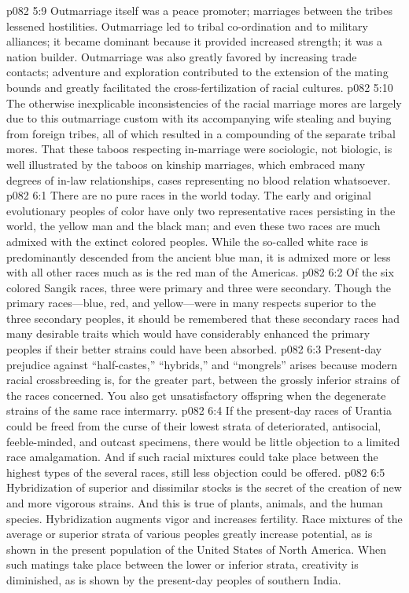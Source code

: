 \vs p082 5:9 Outmarriage itself was a peace promoter; marriages between the tribes lessened hostilities. Outmarriage led to tribal co\hyp{}ordination and to military alliances; it became dominant because it provided increased strength; it was a nation builder. Outmarriage was also greatly favored by increasing trade contacts; adventure and exploration contributed to the extension of the mating bounds and greatly facilitated the cross\hyp{}fertilization of racial cultures.
\vs p082 5:10 The otherwise inexplicable inconsistencies of the racial marriage mores are largely due to this outmarriage custom with its accompanying wife stealing and buying from foreign tribes, all of which resulted in a compounding of the separate tribal mores. That these taboos respecting in\hyp{}marriage were sociologic, not biologic, is well illustrated by the taboos on kinship marriages, which embraced many degrees of in\hyp{}law relationships, cases representing no blood relation whatsoever.
\vs p082 6:1 There are no pure races in the world today. The early and original evolutionary peoples of color have only two representative races persisting in the world, the yellow man and the black man; and even these two races are much admixed with the extinct colored peoples. While the so\hyp{}called white race is predominantly descended from the ancient blue man, it is admixed more or less with all other races much as is the red man of the Americas.
\vs p082 6:2 Of the six colored Sangik races, three were primary and three were secondary. Though the primary races---blue, red, and yellow---were in many respects superior to the three secondary peoples, it should be remembered that these secondary races had many desirable traits which would have considerably enhanced the primary peoples if their better strains could have been absorbed.
\vs p082 6:3 Present\hyp{}day prejudice against “half\hyp{}castes,” “hybrids,” and “mongrels” arises because modern racial crossbreeding is, for the greater part, between the grossly inferior strains of the races concerned. You also get unsatisfactory offspring when the degenerate strains of the same race intermarry.
\vs p082 6:4 If the present\hyp{}day races of Urantia could be freed from the curse of their lowest strata of deteriorated, antisocial, feeble\hyp{}minded, and outcast specimens, there would be little objection to a limited race amalgamation. And if such racial mixtures could take place between the highest types of the several races, still less objection could be offered.
\vs p082 6:5 Hybridization of superior and dissimilar stocks is the secret of the creation of new and more vigorous strains. And this is true of plants, animals, and the human species. Hybridization augments vigor and increases fertility. Race mixtures of the average or superior strata of various peoples greatly increase  potential, as is shown in the present population of the United States of North America. When such matings take place between the lower or inferior strata, creativity is diminished, as is shown by the present\hyp{}day peoples of southern India.
